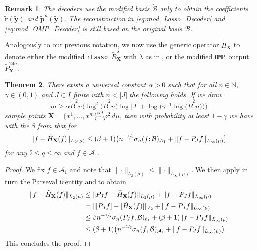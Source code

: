 \documentclass[11pt,reqno, a4paper]{article}
\numberwithin{equation}{section}
\newtheorem{theorem}{Theorem}[section]
\newtheorem{remark}[theorem]{Remark}
\newcommand{\rlasso}{\texttt{rLasso}}
\newcommand{\omp}{\texttt{OMP}}
\begin{document}
\begin{remark}
The decoders use the modified basis $\tilde{\mathcal{B}}$ only to obtain the coefficients $\tilde{\mathbf{r}}(\tilde{\mathbf{y}})$ and $\tilde{\mathbf{p}}^n(\tilde{\mathbf{y}})$. The reconstruction in \eqref{eq:mod_Lasso_Decoder} and \eqref{eq:mod_OMP_Decoder} is still based on the original basis $\mathcal{B}$.
\end{remark}

Analogously to our previous notation, we now use the generic operator $\tilde{H}_{\mathbf{X}}$ to denote either the modified \rlasso \ $\tilde{R}_{\mathbf{X}}^{\lambda}$ with $\lambda$ as in , or the modified \omp \ output $\tilde{P}_{\mathbf{X}}^{24n}$.

\begin{theorem}\label{thm:Recovery_General_Bases}
There exists a universal constant $\alpha>0$ such that for all $n \in \mathbb{N}$, $\gamma \in (0,1)$ and $J\subset I$ finite with $n<\lvert J\rvert$ the following holds.
If we draw
\begin{equation}
	m \geq \alpha \tilde{B}^2 n \bigl({\log^2} \bigl(\tilde{B}^2n\bigr) \log\lvert J\rvert + \log\bigl(\gamma^{-1}\log\bigl(\tilde{B}^2n\bigr)\bigr)\bigr)
\end{equation}
sample points $\mathbf{X}=\{x^1,\ldots,x^m\} \overset{iid}{\sim} \varphi^2\,d\mu$, then with probability at least $1-\gamma$ we have with the $\beta$ from  that for
\begin{gather}
	\lVert f - \tilde{H}_{\mathbf{X}}(f)\rVert_{L_2(\mu)} \leq (\beta+1)\big(n^{-\sfrac{1}{2}}\sigma_n(f;\mathcal{B})_{\mathcal{A}_1} + \lVert f-P_Jf\rVert_{L_\infty(\mu)}\big)
\end{gather}
for any $2\leq q\leq \infty$ and $f \in \mathcal{A}_1$.
\end{theorem}

\begin{proof}
We fix $f\in \mathcal{A}_1$ and note that $\lVert\cdot\rVert_{L_2(\mu)}\leq \lVert\cdot\rVert_{L_\infty(\mu)}$. We then apply in turn the Parseval identity and  to obtain
\begin{align}
\begin{split}
    \lVert f - \tilde{H}_{\mathbf{X}}(f)\rVert_{L_2(\mu)} & \leq \lVert P_Jf - \tilde{H}_{\mathbf{X}}(f)\rVert_{L_2(\mu)} + \lVert f -P_Jf \rVert_{L_\infty(\mu)}\\
    & = \lVert [P_Jf] - [\tilde{H}_{\mathbf{X}}(f)]\rVert_{\ell_2} + \lVert f - P_Jf \rVert_{L_\infty(\mu)}\\
    &\leq \beta n^{-\sfrac{1}{2}}\sigma_n(P_Jf, \mathcal{B})_{\ell_1} + (\beta+1) \lVert f - P_Jf\rVert_{L_\infty(\mu)}\\
    & \leq (\beta+1) \bigl( n^{-\sfrac{1}{2}} \sigma_n(f, \mathcal{B})_{\mathcal{A}_1} + \lVert f-P_Jf\rVert_{L_\infty(\mu)} \bigr).
\end{split}
\end{align}
This concludes the proof.
\end{proof}
\end{document}
